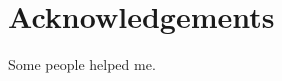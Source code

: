 \documentclass[../thesis.tex]{subfiles}
\begin{document}
\chapter*{Acknowledgements}
Some people helped me.
\end{document}
